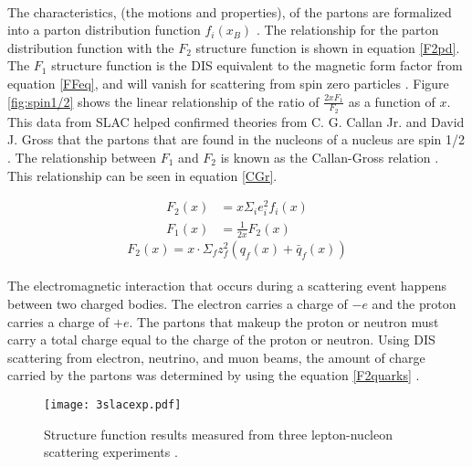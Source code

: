 \paragraph{}The characteristics, (the motions and properties), of the partons are formalized into a parton distribution function $f_i(x_B)$ \cite{PnN}. The relationship for the parton distribution function with the $F_2$ structure function is shown in equation \ref{F2pd}. The $F_1$ structure function is the DIS equivalent to the magnetic form factor from equation \ref{FFeq}, and will vanish for scattering from spin zero particles \cite{PnN}. Figure \ref{fig:spin1/2} shows the linear relationship of the ratio of $\frac{2xF_1}{F_2}$ as a function of $x$. This data from SLAC helped confirmed theories from C. G. Callan Jr. and David J. Gross that the partons that are found in the nucleons of a nucleus are spin 1/2 \cite{callan,DISquark}. The relationship between $F_1$ and $F_2$ is known as the Callan-Gross relation \cite{PnN}. This relationship can be seen in equation \ref{CGr}. 


\begin{align}
		F_2(x) &= x \Sigma_i e^2_i f_i(x) \label{F2pd}\\ 
		F_1(x) &= \frac{1}{2x} F_2(x) \label{CGr} 
\end{align}
\begin{equation}
		F_2(x) = x \cdot \Sigma_f z^2_f ( q_f(x) + \bar{q}_f(x)) \label{F2quarks} 
\end{equation}
\paragraph{}The electromagnetic interaction that occurs during a scattering event happens between two charged bodies. The electron carries a charge of $- e$ and the proton carries a charge of $+e$. The partons that makeup the proton or neutron must carry a total charge equal to the charge of the proton or neutron. Using DIS scattering from electron, neutrino, and muon beams, the amount of charge carried by the partons was determined by using the equation \ref{F2quarks} \cite{PnN,DISquark,callan}. 
\begin{figure}[t]
	\centering
	\texttt{[image: 3slacexp.pdf]} 
	\caption{ Structure function results measured from three  lepton-nucleon scattering experiments \cite{Atwood}.}
	\label{3leps}
\end{figure}
